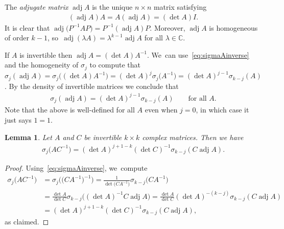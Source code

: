 \documentclass[pdftex]{sigma}
\def\C{\mathbb{C}}
\def\adj{\operatorname{adj}}
\newtheorem{Lemma}[Theorem]{Lemma}
\numberwithin{equation}{section}
\begin{document}
The \emph{adjugate matrix} $\adj A$ is the unique $n \times n$ matrix satisfying
\begin{gather*} %
(\adj A) A = A (\adj A) = (\det A)I.
\end{gather*}
It is clear that $\adj \big(P^{-1} A P\big) = P^{-1} (\adj A) P$. Moreover, $\adj A$ is homogeneous of order $k-1$, so~$\adj(\lambda A) = \lambda^{k-1} \adj A$ for all $\lambda \in \C$.

If $A$ is invertible then $\adj A = (\det A) A^{-1}$. We~can use~\eqref{eq:sigmaAinverse} and the homogeneity of $\sigma_j$ to compute that $\sigma_j(\adj A) = \sigma_j \big( (\det A) A^{-1} \big) = (\det A)^j \sigma_j \big(A^{-1}\big) = (\det A)^{j-1} \sigma_{k-j}(A)$. By the density of invertible matrices we conclude that
\begin{gather} \label{eq:sigmaadjA}
\sigma_j (\adj A) = (\det A)^{j-1} \sigma_{k-j} (A) \qquad \text{for all $A$.}
\end{gather}
Note that the above is well-defined for all $A$ even when $j=0$, in which case it just says $1=1$.

\begin{Lemma} \label{lemma:sigma-adj-1}
Let $A$ and $C$ be \emph{invertible} $k \times k$ complex matrices. Then we have
\begin{gather*} %
\sigma_j \big(A C^{-1}\big) = (\det A)^{j+1-k} (\det C)^{-1} \sigma_{k-j} (C \adj A).
\end{gather*}
\end{Lemma}
\begin{proof}
Using~\eqref{eq:sigmaAinverse}, we~compute
\begin{align*}
\sigma_j \big(A C^{-1}\big) & = \sigma_j \big( \big(C A^{-1}\big)^{-1} \big) = \frac{1}{\det \big(C A^{-1}\big)} \sigma_{k-j} \big(C A^{-1}\big) \\
& = \frac{\det A}{\det C} \sigma_{k-j} \big( (\det A)^{-1} C \adj A\big) = \frac{\det A}{\det C} (\det A)^{-(k-j)} \sigma_{k-j} (C \adj A) \\
& = (\det A)^{j+1-k} (\det C)^{-1} \sigma_{k-j} (C \adj A),
\end{align*}
as claimed.
\end{proof}
\end{document}
